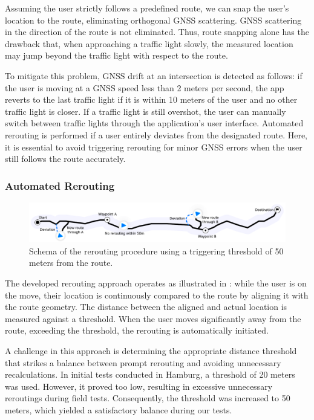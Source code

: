 Assuming the user strictly follows a predefined route, we can snap the user's location to the route, eliminating orthogonal GNSS scattering. GNSS scattering in the direction of the route is not eliminated. Thus, route snapping alone has the drawback that, when approaching a traffic light slowly, the measured location may jump beyond the traffic light with respect to the route. 

To mitigate this problem, GNSS drift at an intersection is detected as follows: if the user is moving at a GNSS speed less than 2 meters per second, the app reverts to the last traffic light if it is within 10 meters of the user and no other traffic light is closer. If a traffic light is still overshot, the user can manually switch between traffic lights through the application's user interface. Automated rerouting is performed if a user entirely deviates from the designated route. Here, it is essential to avoid triggering rerouting for minor GNSS errors when the user still follows the route accurately.

\subsubsection{Automated Rerouting}

\begin{figure}[t]
\centering
\includegraphics[width=\linewidth]{images/rerouting-strategy.pdf}
\caption{Schema of the rerouting procedure using a triggering threshold of 50 meters from the route.}
\label{fig:rerouting-strategy}
\end{figure}

The developed rerouting approach operates as illustrated in : while the user is on the move, their location is continuously compared to the route by aligning it with the route geometry. The distance between the aligned and actual location is measured against a threshold. When the user moves significantly away from the route, exceeding the threshold, the rerouting is automatically initiated. 

A challenge in this approach is determining the appropriate distance threshold that strikes a balance between prompt rerouting and avoiding unnecessary recalculations. In initial tests conducted in Hamburg, a threshold of 20 meters was used. However, it proved too low, resulting in excessive unnecessary reroutings during field tests. Consequently, the threshold was increased to 50 meters, which yielded a satisfactory balance during our tests.

